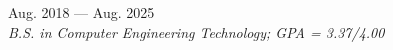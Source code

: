 
	\hfill Aug. 2018 --- Aug. 2025\\
\textit{B.S. in Computer Engineering Technology; GPA = 3.37/4.00}

